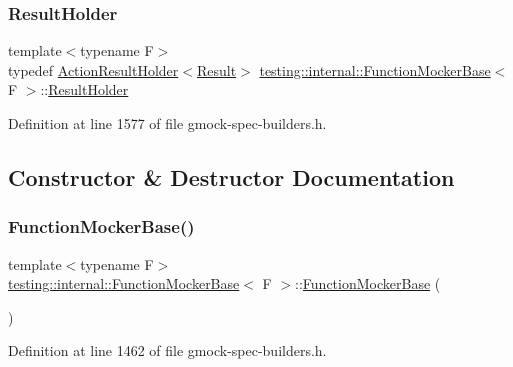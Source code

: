 \subsubsection{\texorpdfstring{Result\+Holder}{ResultHolder}}
{\footnotesize\ttfamily template$<$typename F$>$ \\
typedef \hyperlink{classtesting_1_1internal_1_1ActionResultHolder}{Action\+Result\+Holder}$<$\hyperlink{classtesting_1_1internal_1_1FunctionMockerBase_aa50abc4055b4d3a14ad64c317bccec8d}{Result}$>$ \hyperlink{classtesting_1_1internal_1_1FunctionMockerBase}{testing\+::internal\+::\+Function\+Mocker\+Base}$<$ F $>$\+::\hyperlink{classtesting_1_1internal_1_1FunctionMockerBase_aa4e1b2ee217676c9e70c3006b19a8074}{Result\+Holder}\hspace{0.3cm}{\ttfamily [protected]}}



Definition at line 1577 of file gmock-\/spec-\/builders.\+h.



\subsection{Constructor \& Destructor Documentation}
\mbox{\label{classtesting_1_1internal_1_1FunctionMockerBase_a2206d80aad533ba6bf1f5e09c909aee0}} 
\subsubsection{\texorpdfstring{Function\+Mocker\+Base()}{FunctionMockerBase()}}
{\footnotesize\ttfamily template$<$typename F$>$ \\
\hyperlink{classtesting_1_1internal_1_1FunctionMockerBase}{testing\+::internal\+::\+Function\+Mocker\+Base}$<$ F $>$\+::\hyperlink{classtesting_1_1internal_1_1FunctionMockerBase}{Function\+Mocker\+Base} (\begin{DoxyParamCaption}{ }\end{DoxyParamCaption})\hspace{0.3cm}{\ttfamily [inline]}}



Definition at line 1462 of file gmock-\/spec-\/builders.\+h.


